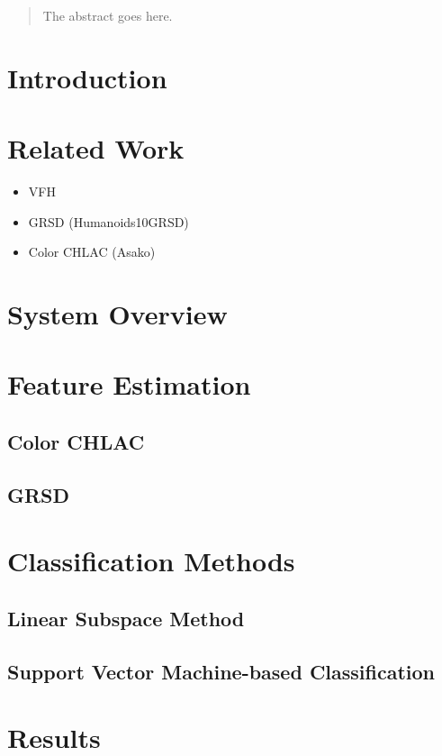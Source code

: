 \documentclass[conference]{sty/IEEEtran}
\begin{document}
\begin{abstract}
The abstract goes here.
\end{abstract}

\IEEEpeerreviewmaketitle

\section{Introduction}

\section{Related Work}
\begin{itemize}
\item VFH
\item GRSD (Humanoids10GRSD)\cite{kalman1960new} 
\item Color CHLAC (Asako)
\end{itemize}

\section{System Overview}


\section{Feature Estimation}

\subsection{Color CHLAC}
\subsection{GRSD}


\section{Classification Methods}

\subsection{Linear Subspace Method}
\subsection{Support Vector Machine-based Classification}


\section{Results}
\end{document}
